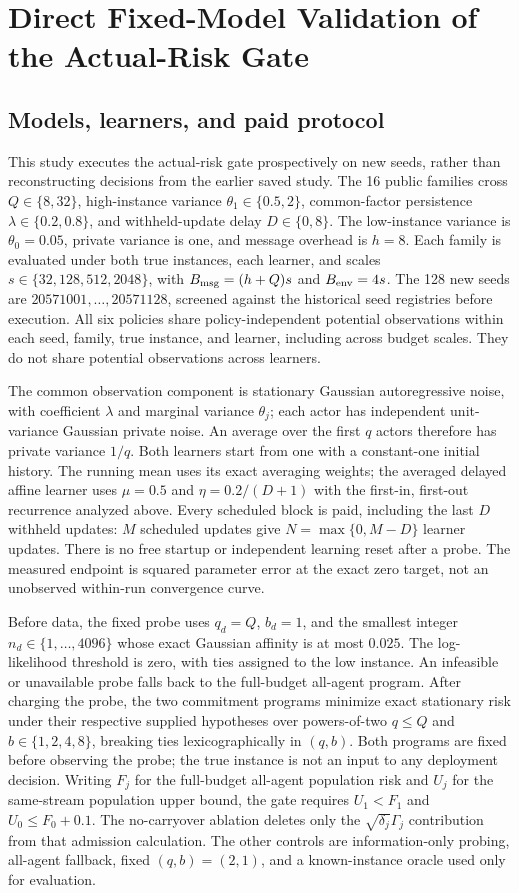 \documentclass[journal]{IEEEtran}
\begin{document}
\section{Direct Fixed-Model Validation of the Actual-Risk Gate}
\subsection{Models, learners, and paid protocol}
This study executes the actual-risk gate prospectively on new seeds, rather than reconstructing decisions from the earlier saved study.
The 16 public families cross $Q\in\{8,32\}$, high-instance variance $\theta_1\in\{0.5,2\}$, common-factor persistence $\lambda\in\{0.2,0.8\}$, and withheld-update delay $D\in\{0,8\}$.
The low-instance variance is $\theta_0=0.05$, private variance is one, and message overhead is $h=8$.
Each family is evaluated under both true instances, each learner, and scales $s\in\{32,128,512,2048\}$, with $B_{\rm msg}=(h+Q)s$ and $B_{\rm env}=4s$.
The 128 new seeds are $20571001,\ldots,20571128$, screened against the historical seed registries before execution.
All six policies share policy-independent potential observations within each seed, family, true instance, and learner, including across budget scales.
They do not share potential observations across learners.

The common observation component is stationary Gaussian autoregressive noise, with coefficient $\lambda$ and marginal variance $\theta_j$; each actor has independent unit-variance Gaussian private noise.
An average over the first $q$ actors therefore has private variance $1/q$.
Both learners start from one with a constant-one initial history.
The running mean uses its exact averaging weights; the averaged delayed affine learner uses $\mu=0.5$ and $\eta=0.2/(D+1)$ with the first-in, first-out recurrence analyzed above.
Every scheduled block is paid, including the last $D$ withheld updates: $M$ scheduled updates give $N=\max\{0,M-D\}$ learner updates.
There is no free startup or independent learning reset after a probe.
The measured endpoint is squared parameter error at the exact zero target, not an unobserved within-run convergence curve.

Before data, the fixed probe uses $q_d=Q$, $b_d=1$, and the smallest integer $n_d\in\{1,\ldots,4096\}$ whose exact Gaussian affinity is at most $0.025$.
The log-likelihood threshold is zero, with ties assigned to the low instance.
An infeasible or unavailable probe falls back to the full-budget all-agent program.
After charging the probe, the two commitment programs minimize exact stationary risk under their respective supplied hypotheses over powers-of-two $q\le Q$ and $b\in\{1,2,4,8\}$, breaking ties lexicographically in $(q,b)$.
Both programs are fixed before observing the probe; the true instance is not an input to any deployment decision.
Writing $F_j$ for the full-budget all-agent population risk and $U_j$ for the same-stream population upper bound, the gate requires $U_1<F_1$ and $U_0\le F_0+0.1$.
The no-carryover ablation deletes only the $\sqrt{\delta_j}\Gamma_j$ contribution from that admission calculation.
The other controls are information-only probing, all-agent fallback, fixed $(q,b)=(2,1)$, and a known-instance oracle used only for evaluation.
\end{document}

